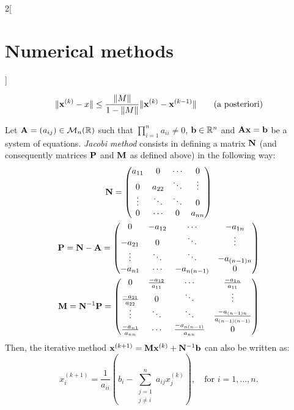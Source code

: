 \documentclass[../../../main.tex]{subfiles}
\begin{document}
\begin{multicols}{2}[\section{Numerical methods}]
\begin{prop}
\begin{align*}
        \|\vb{x}^{(k)}-x\|&\leq\frac{\|M\|}{1-\|M\|}\|\vb{x}^{(k)}-\vb{x}^{(k-1)}\|\quad&\text{(a posteriori)}
    \end{align*}
\end{prop}
\begin{definition}
    Let $\vb{A}=(a_{ij})\in\mathcal{M}_n(\mathbb{R})$ such that $\prod_{i=1}^na_{ii}\ne 0$, $\vb{b}\in\mathbb{R}^n$ and $\vb{A}\vb{x}=\vb{b}$ be a system of equations. \textit{Jacobi method} consists in defining a matrix $\vb{N}$ (and consequently matrices $\vb{P}$ and $\vb{M}$ as defined above) in the following way:
    \begin{gather*}
        \vb{N}=
        \begin{pmatrix}
            a_{11} & 0 & \cdots & 0\\
            0 & a_{22} & \ddots & \vdots\\
            \vdots & \ddots & \ddots & 0\\
            0 & \cdots & 0 & a_{nn}
        \end{pmatrix}\\
        \vb{P}=\vb{N}-\vb{A}=
        \begin{pmatrix}
            0 & -a_{12} & \cdots & -a_{1n}\\
            -a_{21} & 0 & \ddots & \vdots\\
            \vdots & \ddots & \ddots & -a_{(n-1)n}\\
            -a_{n1} & \cdots & -a_{n(n-1)} & 0
        \end{pmatrix}\\
        \vb{M}=\vb{N}^{-1}\vb{P}=
        \begin{pmatrix}
            0 & \frac{-a_{12}}{a_{11}} & \cdots & \frac{-a_{1n}}{a_{11}}\\
            \frac{-a_{21}}{a_{22}} & 0 & \ddots & \vdots\\
            \vdots & \ddots & \ddots & \frac{-a_{(n-1)n}}{a_{(n-1)(n-1)}}\\
            \frac{-a_{n1}}{a_{nn}} & \cdots & \frac{-a_{n(n-1)}}{a_{nn}} & 0
        \end{pmatrix}\\
    \end{gather*}
    Then, the iterative method $\vb{x}^{(k+1)}=\vb{M}\vb{x}^{(k)}+\vb{N}^{-1}\vb{b}$ can also be written as: $$x_i^{(k+1)}=\frac{1}{a_{ii}}\left(b_i-\sum_{\substack{j=1\\j\ne i}}^na_{ij}x_j^{(k)}\right),\quad\text{for }i=1,\ldots,n.$$

\end{definition}
\end{multicols}
\end{document}
